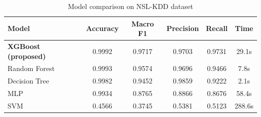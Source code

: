 \begin{table}[h]
\centering
\caption{Model comparison on NSL-KDD dataset}
\label{tab:baseline}
\begin{tabular}{lccccc}
\hline
\textbf{Model} & \textbf{Accuracy} & \textbf{Macro F1} & \textbf{Precision} & \textbf{Recall} & \textbf{Time} \\
\hline
\textbf{XGBoost (proposed)} & 0.9992 & 0.9717 & 0.9703 & 0.9731 & 29.1s \\
Random Forest & 0.9993 & 0.9574 & 0.9696 & 0.9466 & 7.8s \\
Decision Tree & 0.9982 & 0.9452 & 0.9859 & 0.9222 & 2.1s \\
MLP & 0.9934 & 0.8765 & 0.8866 & 0.8676 & 58.4s \\
SVM & 0.4566 & 0.3745 & 0.5381 & 0.5123 & 288.6s \\
\hline
\end{tabular}
\end{table}